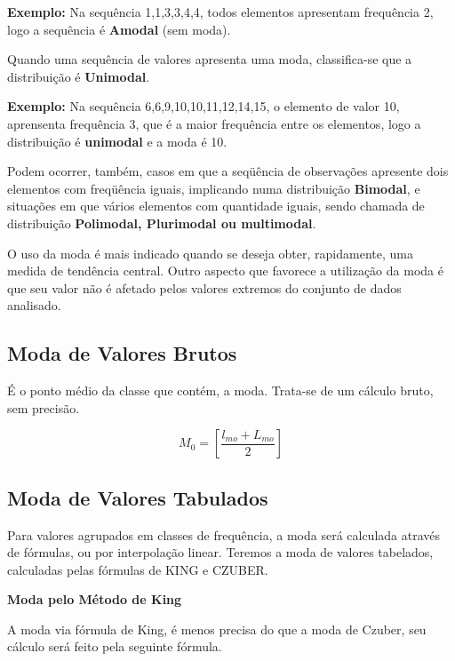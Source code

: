 \textbf{Exemplo:} Na sequência 1,1,3,3,4,4, todos elementos apresentam frequência 2, logo a sequência é \textbf{Amodal} (sem moda).\vskip0.3cm

Quando uma sequência de valores apresenta uma moda, classifica-se que a distribuição é \textbf{Unimodal}.\vskip0.3cm


\textbf{Exemplo:} Na sequência 6,6,9,10,10,11,12,14,15, o elemento de valor 10, aprensenta frequência 3, que é a maior frequência entre os elementos, logo a distribuição é \textbf{unimodal} e a moda é 10.\vskip0.3cm

Podem ocorrer, também, casos em que a seqüência de observações apresente dois elementos com freqüência iguais, implicando numa distribuição \textbf{Bimodal}, e situações em que vários elementos com quantidade iguais, sendo chamada de distribuição \textbf{Polimodal, Plurimodal ou multimodal}.\vskip0.3cm

O uso da moda é mais indicado quando se deseja obter, rapidamente, uma medida de tendência central. Outro aspecto que favorece a utilização da moda é que seu valor não é afetado pelos valores extremos do conjunto de dados analisado.\vskip0.3cm

\subsection{Moda de Valores Brutos}

\vskip0.3cm


É o ponto médio da classe que contém, a moda. Trata-se de um cálculo bruto, sem precisão.

\begin{equation}\label{}
    M_{0}= \left[\frac{l_{mo}+L_{mo}}{2}\right]
\end{equation}


\subsection{Moda de Valores Tabulados}

\vskip0.3cm

Para valores agrupados em classes de frequência, a moda será calculada através de fórmulas, ou por interpolação linear. Teremos a moda de valores tabelados, calculadas pelas fórmulas de KING e CZUBER.
\vskip0.3cm


\textbf{Moda pelo Método de King}
\vskip0.3cm

A moda via fórmula de King, é menos precisa do que a moda de Czuber, seu cálculo será feito pela seguinte fórmula.


